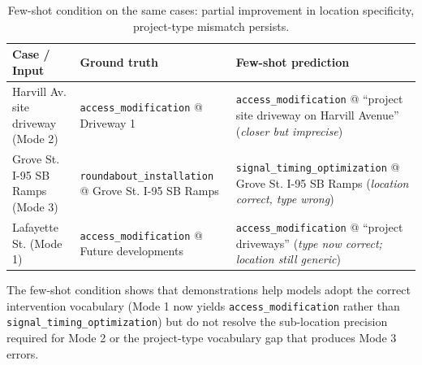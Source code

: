 \documentclass[preprint,12pt]{elsarticle}
\begin{document}
\begin{table}[h]
\centering
\caption{Few-shot condition on the same cases: partial improvement in
location specificity, project-type mismatch persists.}
\label{tab:qualitative_rag}
\begin{tabular}{p{3.0cm}p{4.2cm}p{4.2cm}}
\toprule
Case / Input & Ground truth & Few-shot prediction \\
\midrule
Harvill Av. site driveway (Mode 2) &
\texttt{access\_modification} @ Driveway 1 &
\texttt{access\_modification} @ ``project site driveway on Harvill Avenue''
(\emph{closer but imprecise}) \\
\addlinespace
Grove St. I-95 SB Ramps (Mode 3) &
\texttt{roundabout\_installation} @ Grove St. I-95 SB Ramps &
\texttt{signal\_timing\_optimization} @ Grove St. I-95 SB Ramps
(\emph{location correct, type wrong}) \\
\addlinespace
Lafayette St. (Mode 1) &
\texttt{access\_modification} @ Future developments &
\texttt{access\_modification} @ ``project driveways''
(\emph{type now correct; location still generic}) \\
\bottomrule
\end{tabular}
\end{table}

The few-shot condition shows that demonstrations help models adopt the
correct intervention vocabulary (Mode 1 now yields \texttt{access\_modification}
rather than \texttt{signal\_timing\_optimization}) but do not resolve the
sub-location precision required for Mode 2 or the project-type vocabulary
gap that produces Mode 3 errors.



\end{document}
